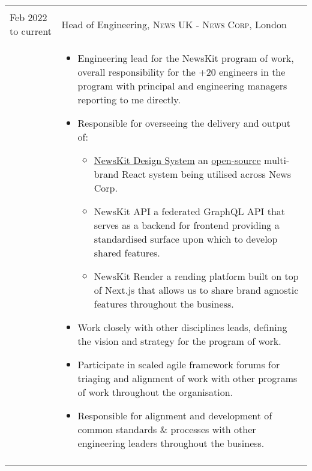 \documentclass[a4paper,10pt]{article} %
\begin{document}
\begin{tabular}{ L{2cm} | L{11cm}}	
	 \\
	Feb 2022 to current & Head of Engineering, \textsc{News UK - News Corp}, London \\
	&\MPtrue
	\begin{itemize}[leftmargin=*]
			\item Engineering lead for the NewsKit program of work, overall responsibility for the +20 engineers in the program with principal and engineering managers reporting to me directly. 	
			\item Responsible for overseeing the delivery and output of:
				\begin{itemize}
					\item \href{https://newskit.co.uk}{NewsKit Design System} an \href{https://github.com/newscorp-ghfb/newskit/}{open-source} multi-brand React system being utilised across News Corp.
					\item NewsKit API a federated GraphQL API that serves as a backend for frontend providing a standardised surface upon which to develop shared features.
					\item NewsKit Render a rending platform built on top of Next.js that allows us to share brand agnostic features throughout the business.
				\end{itemize}
			\item Work closely with other disciplines leads, defining the vision and strategy for the program of work.
			\item Participate in scaled agile framework forums for triaging and alignment of work with other programs of work throughout the organisation. 			
			\item Responsible for alignment and development of common standards \& processes with other engineering leaders throughout the business. 				
		\end{itemize} \\ 
	 \\

\end{tabular}
\clearpage
\end{document}
